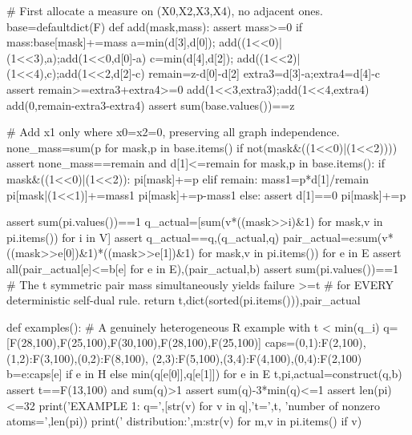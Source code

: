 \documentclass[11pt,a4paper]{ctexart}
\theoremstyle{remark}\newtheorem{remark}[theorem]{备注}
\begin{document}
\begin{CodeListing}
    # First allocate a measure on (X0,X2,X3,X4), no adjacent ones.
    base=defaultdict(F)
    def add(mask,mass):
        assert mass>=0
        if mass:base[mask]+=mass
    a=min(d[3],d[0]); add((1<<0)|(1<<3),a);add(1<<0,d[0]-a)
    c=min(d[4],d[2]); add((1<<2)|(1<<4),c);add(1<<2,d[2]-c)
    remain=z-d[0]-d[2]
    extra3=d[3]-a;extra4=d[4]-c
    assert remain>=extra3+extra4>=0
    add(1<<3,extra3);add(1<<4,extra4)
    add(0,remain-extra3-extra4)
    assert sum(base.values())==z

    # Add x1 only where x0=x2=0, preserving all graph independence.
    none_mass=sum(p for mask,p in base.items() if not(mask&((1<<0)|(1<<2))))
    assert none_mass==remain and d[1]<=remain
    for mask,p in base.items():
        if mask&((1<<0)|(1<<2)):
            pi[mask]+=p
        elif remain:
            mass1=p*d[1]/remain
            pi[mask|(1<<1)]+=mass1
            pi[mask]+=p-mass1
        else:
            assert d[1]==0
            pi[mask]+=p

    assert sum(pi.values())==1
    q_actual=[sum(v*((mask>>i)&1) for mask,v in pi.items()) for i in V]
    assert q_actual==q,(q_actual,q)
    pair_actual={e:sum(v*((mask>>e[0])&1)*((mask>>e[1])&1)
                       for mask,v in pi.items()) for e in E}
    assert all(pair_actual[e]<=b[e] for e in E),(pair_actual,b)
    assert sum(pi.values())==1
    # The t symmetric pair mass simultaneously yields failure >=t
    # for EVERY deterministic self-dual rule.
    return t,dict(sorted(pi.items())),pair_actual

def examples():
    # A genuinely heterogeneous R example with t < min(q_i)
    q=[F(28,100),F(25,100),F(30,100),F(28,100),F(25,100)]
    caps={(0,1):F(2,100),(1,2):F(3,100),(0,2):F(8,100),
          (2,3):F(5,100),(3,4):F(4,100),(0,4):F(2,100)}
    b={e:caps[e] if e in H else min(q[e[0]],q[e[1]]) for e in E}
    t,pi,actual=construct(q,b)
    assert t==F(13,100) and sum(q)>1
    assert sum(q)-3*min(q)<=1
    assert len(pi)<=32
    print('EXAMPLE 1: q=',[str(v) for v in q],'t=',t,
          'number of nonzero atoms=',len(pi))
    print('  distribution:',{m:str(v) for m,v in pi.items() if v})


\end{CodeListing}
\end{document}
